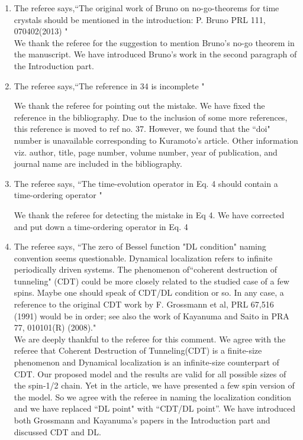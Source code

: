 \documentclass[aps,prb,reprint,showpacs,floatfix,superscriptaddress, onecolumn, 9pt]{revtex4-2}
\newcommand{\ar}[1]{{\color{blue}#1}} %
\begin{document}
\begin{enumerate}
    \item The referee says,``The original work of Bruno on no-go-theorems for time crystals should be mentioned in the introduction: P. Bruno PRL 111, 070402(2013) "\\

    \ar{
    We thank the referee for the suggestion to mention Bruno's no-go theorem in the manuscript. We have introduced Bruno's work in the second paragraph of the Introduction part.
    }
    \item The referee says,``The reference in 34 is incomplete "

    \ar{
    We thank the referee for pointing out the mistake. We have fixed the reference in the bibliography. Due to the inclusion of some more references, this reference is moved to ref no. 37. However, we found that the ``doi" number is unavailable corresponding to Kuramoto's article. Other information viz. author, title, page number, volume number, year of publication, and journal name are included in the bibliography. 
    }

    \item The referee says, ``The time-evolution operator in Eq. 4 should contain a time-ordering operator "

    \ar{
    We thank the referee for detecting the mistake in Eq 4. We have corrected and put down a time-ordering operator in Eq. 4
    }

    \item The referee says, ``The zero of Bessel function "DL condition" naming convention seems questionable. Dynamical localization refers to infinite periodically driven systems. The phenomenon of``coherent destruction of tunneling" (CDT) could be more closely related to the studied case of a few spins. Maybe one should speak of CDT/DL condition or so. In any case, a reference to the original CDT work by F. Grossmann et al, PRL 67,516 (1991) would be in order; see also the work of Kayanuma and Saito in PRA 77, 010101(R) (2008)."\\

    \ar{
    We are deeply thankful to the referee for this comment. We agree with the referee that Coherent Destruction of Tunneling(CDT) is a finite-size phenomenon and Dynamical localization is an infinite-size counterpart of CDT. Our proposed model and the results are valid for all possible sizes of the spin-1/2 chain. Yet in the article, we have presented a few spin version of the model. So we agree with the referee in naming the localization condition and we have replaced ``DL point" with ``CDT/DL point''. We have introduced both Grossmann and Kayanuma's papers in the Introduction part and discussed CDT and DL.
    }


\end{enumerate}
\end{document}
